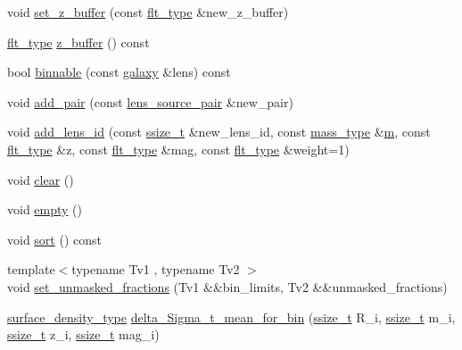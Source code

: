 \begin{DoxyCompactItemize}
void \hyperlink{classIceBRG_1_1pair__binner_a1785f044a69bdd9376d63843248e4c17}{set\-\_\-z\-\_\-buffer} (const \hyperlink{lib_2IceBRG__main_2common_8h_ad0f130a56eeb944d9ef2692ee881ecc4}{flt\-\_\-type} \&new\-\_\-z\-\_\-buffer)
\item 
\hyperlink{lib_2IceBRG__main_2common_8h_ad0f130a56eeb944d9ef2692ee881ecc4}{flt\-\_\-type} \hyperlink{classIceBRG_1_1pair__binner_afc88be4e3536fd0f73538d2a368b1b27}{z\-\_\-buffer} () const 
\item 
bool \hyperlink{classIceBRG_1_1pair__binner_a3d0bc270b81bdf3d0fd7f5098448e7ba}{binnable} (const \hyperlink{classIceBRG_1_1galaxy}{galaxy} \&lens) const 
\item 
void \hyperlink{classIceBRG_1_1pair__binner_a8a4c12129a660eb007da7d2c8aaa1224}{add\-\_\-pair} (const \hyperlink{classIceBRG_1_1lens__source__pair}{lens\-\_\-source\-\_\-pair} \&new\-\_\-pair)
\item 
void \hyperlink{classIceBRG_1_1pair__binner_a98d977adcf1255e16c26348f1c2fe5cd}{add\-\_\-lens\-\_\-id} (const \hyperlink{lib_2IceBRG__main_2common_8h_ab322a3e50421dc5f0c43316b1b373592}{ssize\-\_\-t} \&new\-\_\-lens\-\_\-id, const \hyperlink{namespaceIceBRG_a1be72ac4918a9b029f2eefa084213e35}{mass\-\_\-type} \&\hyperlink{namespaceIceBRG_ada6365c5d16106f0608afbd34f010bcc}{m}, const \hyperlink{lib_2IceBRG__main_2common_8h_ad0f130a56eeb944d9ef2692ee881ecc4}{flt\-\_\-type} \&z, const \hyperlink{lib_2IceBRG__main_2common_8h_ad0f130a56eeb944d9ef2692ee881ecc4}{flt\-\_\-type} \&mag, const \hyperlink{lib_2IceBRG__main_2common_8h_ad0f130a56eeb944d9ef2692ee881ecc4}{flt\-\_\-type} \&weight=1)
\item 
void \hyperlink{classIceBRG_1_1pair__binner_a25c3cddd7575cb0012a301772770027d}{clear} ()
\item 
void \hyperlink{classIceBRG_1_1pair__binner_a01b62fd022293870317bbcb3d8a809ff}{empty} ()
\item 
void \hyperlink{classIceBRG_1_1pair__binner_ae164bdb3724a73f199ecdd7b4c878ee7}{sort} () const 
\item 
{\footnotesize template$<$typename Tv1 , typename Tv2 $>$ }\\void \hyperlink{classIceBRG_1_1pair__binner_aa2ab94f5347d9af9ef901fbe9519d15e}{set\-\_\-unmasked\-\_\-fractions} (Tv1 \&\&bin\-\_\-limits, Tv2 \&\&unmasked\-\_\-fractions)
\item 
\hyperlink{namespaceIceBRG_a80c597ef5ba0a32491d32a9f0083b02d}{surface\-\_\-density\-\_\-type} \hyperlink{classIceBRG_1_1pair__binner_a00a64eeb64d7d7c2bd2587371ade8a0c}{delta\-\_\-\-Sigma\-\_\-t\-\_\-mean\-\_\-for\-\_\-bin} (\hyperlink{lib_2IceBRG__main_2common_8h_ab322a3e50421dc5f0c43316b1b373592}{ssize\-\_\-t} R\-\_\-i, \hyperlink{lib_2IceBRG__main_2common_8h_ab322a3e50421dc5f0c43316b1b373592}{ssize\-\_\-t} m\-\_\-i, \hyperlink{lib_2IceBRG__main_2common_8h_ab322a3e50421dc5f0c43316b1b373592}{ssize\-\_\-t} z\-\_\-i, \hyperlink{lib_2IceBRG__main_2common_8h_ab322a3e50421dc5f0c43316b1b373592}{ssize\-\_\-t} mag\-\_\-i)

\end{DoxyCompactItemize}
